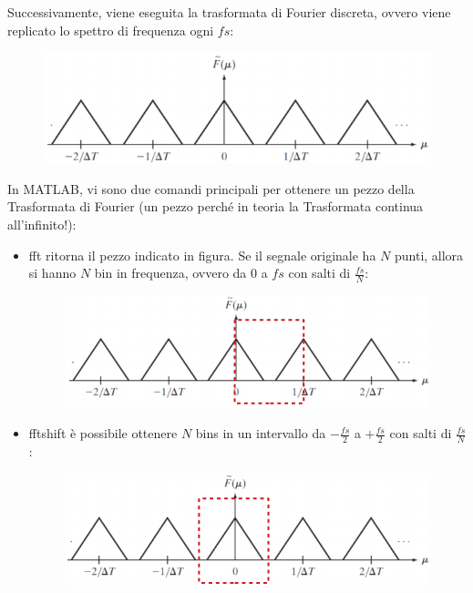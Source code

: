 \documentclass[a4paper]{article}
\begin{document}
	\noindent
	Successivamente, viene eseguita la trasformata di Fourier discreta, ovvero viene replicato lo spettro di frequenza ogni $fs$:
	\begin{figure}[!htp]
		\centering
		\includegraphics[width=\textwidth]{img/lab/TdF.png}
	\end{figure}
	
	\noindent
	In MATLAB, vi sono due comandi principali per ottenere un pezzo della Trasformata di Fourier (un pezzo perché in teoria la Trasformata continua all'infinito!):
	\begin{itemize}
		\item \textsf{fft} ritorna il pezzo indicato in figura. Se il segnale originale ha $N$ punti, allora si hanno $N$ bin in frequenza, ovvero da $0$ a $fs$ con salti di $\frac{fs}{N}$:
		\begin{figure}[!htp]
			\centering
			\includegraphics[width=\textwidth]{img/lab/TdF-1.png}
		\end{figure}
		
		\item \textsf{fftshift} è possibile ottenere $N$ bins in un intervallo da $-\frac{fs}{2}$ a $+\frac{fs}{2}$ con salti di $\frac{fs}{N}$:
		\begin{figure}[!htp]
			\centering
			\includegraphics[width=\textwidth]{img/lab/TdF-2.png}
		\end{figure}
	\end{itemize}
	
\end{document}
